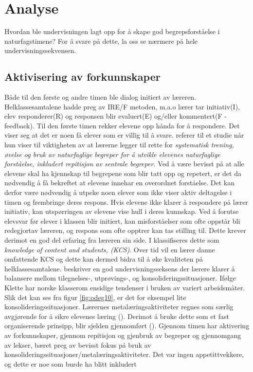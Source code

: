 \documentclass[main.tex]{subfiles}
\begin{document}
\section*{Analyse}
\label{sec:2}

Hvordan ble undervisningen lagt opp for å skape god begrepsforståelse i naturfagstimene?
For å svare på dette, la oss se nærmere på hele undervisningssekvensen.
\newline
\newline
\subsection*{Aktivisering av forkunnskaper}
Både til den første og andre timen ble dialog initiert av læreren. Helklassesamtalene hadde preg av
IRE/F metoden, m.a.o lærer tar initiativ(I), elev responderer(R) og responsen blir evaluert(E) 
og/eller kommentert(F - feedback). Til den første timen rekker elevene opp hånda for å 
respondere. Det viser seg at det er noen få elever som er villig til å svare. 
\newline
\newline
{} referer til et studie når hun viser til viktigheten av at lærerne 
legger til rette for \emph{systematisk trening, øvelse og bruk av naturfaglige begreper for å utvikle 
elevenes naturfaglige forståelse, inkludert repitisjon av sentrale begreper.}
\newline
\newline
Ved å være bevisst på at alle elevene skal ha kjennskap til 
begrepene som blir tatt opp og repetert, er det da nødvendig å få bekreftet at elevene innehar en 
overordnet forståelse. Det kan derfor være nødvendig å utpeke noen elever som ikke viser aktiv 
deltagelse i timen og frembringe deres respons. Hvis elevene ikke klarer å respondere på lærer 
initiativ, kan utspørringen av elevene vise hull i deres kunnskap. Ved å forutse elevsvar før elever 
i klassen blir initiert, kan misforståelser som ofte oppstår bli redegjortav læreren, og respons som 
ofte opptrer kan tas stilling til. Dette krever derimot en god del erfaring fra læreren sin side. I 
 klassifiseres dette som \emph{knowledge of content and students, (KCS)}.
Over tid vil en lærer danne omfattende KCS og dette kan dermed bidra til å øke kvaliteten på
helklassesamtalene.
\newline
\newline
{} beskriver en god undervisningsseksens der lærere klarer å balansere mellom 
tilegnelses-, utprøvings-, og konsolideringssituasjoner. Ifølge Klette har norske klasserom ensidige 
tendenser i bruken av variert arbeidsmåter. Slik det kan ses fra figur \ref{fig:odeg10}, er det for 
eksempel lite konsolideringssituasjoner. Lærernes metalæringsaktiviteter regnes som særlig avgjørende 
for å sikre elevenes læring (). Derimot å bruke dette som et fast
organiserende prinsipp, blir sjelden gjennomført (). Gjennom timen har 
aktivering av forkunnskaper, gjennom repitisjon og gjenbruk av begreper og gjennomgang av 
lekser, bæret preg av bevisst fokus på bruk av konsolideringssituasjoner/metalæringsaktiviteter.
Det var ingen appetittvekkere, og dette er noe som burde ha blitt inkludert 
\end{document}
